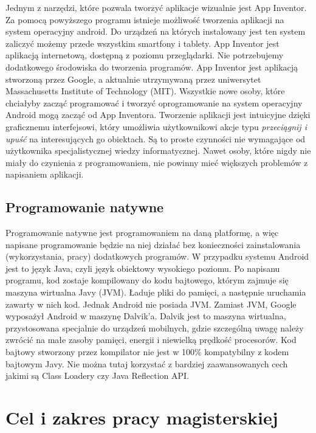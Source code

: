 Jednym z narzędzi, które pozwala tworzyć aplikacje wizualnie jest App Inventor. Za pomocą powyższego programu istnieje możliwość tworzenia aplikacji na system operacyjny android. Do urządzeń na których instalowany jest ten system zaliczyć możemy przede wszystkim smartfony i tablety. App Inventor jest aplikacją internetową, dostępną z poziomu przeglądarki. Nie potrzebujemy dodatkowego środowiska do tworzenia programów. App Inventor jest aplikacją stworzoną przez Google, a aktualnie utrzymywaną przez uniwersytet Massachusetts Institute of Technology (MIT). Wszystkie nowe osoby, które chciałyby zacząć programować i tworzyć oprogramowanie na system operacyjny Android mogą zacząć od App Inventora. Tworzenie aplikacji jest intuicyjne dzięki graficznemu interfejsowi, który umożliwia użytkownikowi akcje typu \emph{przeciągnij i upuść} na interesujących go obiektach.\cite{wiki:appinventor} Są to proste czynności nie wymagające od użytkownika specjalistycznej wiedzy informatycznej. Nawet osoby, które nigdy nie miały do czynienia z programowaniem, nie powinny mieć większych problemów z napisaniem aplikacji. 

\subsection{Programowanie natywne}
\label{c112}

Programowanie natywne jest programowaniem na daną platformę, a więc napisane programowanie będzie na niej działać bez konieczności zainstalowania (wykorzystania, pracy) dodatkowych programów. W przypadku systemu Android jest to język Java, czyli język obiektowy wysokiego poziomu. Po napisanu programu, kod zostaje kompilowany do kodu bajtowego, którym zajmuje się maszyna wirtualna Javy (JVM). Ładuje pliki do pamięci, a następnie uruchamia zawarty w nich kod. Jednak Android nie posiada JVM. Zamiast JVM, Google wyposażył Android w maszynę Dalvik'a. Dalvik jest to maszyna wirtualna, przystosowana specjalnie do urządzeń mobilnych, gdzie szczególną uwagę należy zwrócić na małe zasoby pamięci, energii i niewielką prędkość procesorów. Kod bajtowy stworzony przez kompilator nie jest w 100\% kompatybilny z kodem bajtowym Javy. Nie można tutaj korzystać z bardziej zaawansowanych cech jakimi są Class Loadery czy Java Reflection API. \cite{gphone:dalvik}

\section{Cel i zakres pracy magisterskiej}
\label{c12}

